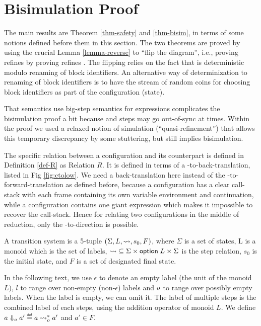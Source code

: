 \newpage

\section{Bisimulation Proof} \label{section-bisim}

The main results are Theorem \ref{thm-safety} and \ref{thm-bisim}, in terms of some notions defined before them in this section. The two theorems are proved by using the crucial Lemma \ref{lemma-reverse} to ``flip the diagram'', i.e., proving \cstar refines \lamstar by proving \lamstar refines \cstar. The flipping relies on the fact that \cstar is deterministic modulo renaming of block identifiers. An alternative way of determinization to renaming of block identifiers is to have the stream of random coins for choosing block identifiers as part of the configuration (state).

That \cstar semantics use
big-step semantics for \cstar expressions complicates the bisimulation
proof a bit because \lamstar and \cstar steps may go out-of-sync at
times. Within the proof we used a relaxed notion of simulation
(``quasi-refinement'') that allows this temporary discrepancy by some
stuttering, but still implies bisimulation.

The specific relation between a \lamstar configuration and its \cstar counterpart is defined in Definition \ref{def-R} as Relation $R$.  It is defined in terms of a \cstar-to-\lamstar back-translation, listed in Fig \ref{fig:ctolow}. We need a back-translation here instead of the \lamstar-to-\cstar forward-translation as defined before, because a \cstar configuration has a clear call-stack with each frame containing its own variable environment and continuation, while a \lamstar configuration contains one giant \lamstar expression which makes it impossible to recover the call-stack. Hence for relating two configurations in the middle of reduction, only the \cstar-to-\lamstar direction is possible.

\begin{definition} \label{def-trsys}
  A transition system is a 5-tuple $(\Sigma, L, \leadsto, s_0, F)$, where $\Sigma$ is a set of states, L is a monoid which is the set of labels, $\leadsto\;\subseteq\Sigma\times \text{\textsf{option}}\;L\times \Sigma$ is the step relation, $s_0$ is the initial state, and $F$ is a set of designated final state.
\end{definition}

In the following text, we use $\epsilon$ to denote an empty label (the unit of the monoid $L$), $l$ to range over non-empty (non-$\epsilon$) labels and $o$ to range over possibly empty labels. When the label is empty, we can omit it. The label of multiple steps is the combined label of each steps, using the addition operator of monoid $L$. We define $a\Downarrow_\olabel a'\defeq a\step^*_\olabel a'$ and $a'\in F$.

